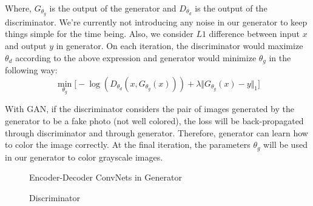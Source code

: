 \documentclass[oneside,a4paper,12pt]{report}
\begin{document}
	Where, $G_{\theta_{g}}$ is the output of the generator and $D_{\theta_d}$ is the output of the discriminator.	
	We're currently not introducing any noise in our generator to keep things simple for the time being. Also, we consider $L1$ difference between input $x$ and output $y$ in generator. On each iteration, the discriminator would maximize $\theta_d$ according to the above expression and generator would minimize $\theta_g$ in the following way:
	\[
		\min_{\theta_g}\Big[-\log(D_{\theta_d}(x,G_{\theta_g}(x)))+\lambda \Vert G_{\theta_g}(x) - y \Vert_1 \Big]
	\]
	
	With GAN, if the discriminator considers the pair of images generated by the generator to be a fake photo (not well colored), the loss will be back-propagated through discriminator and through generator. Therefore, generator can learn how to color the image correctly. At the final iteration, the parameters $\theta_g$ will be used in our generator to color grayscale images. 

  \begin{center}
	\begin{figure}[!htbp]
		\centering
	  \caption{Encoder-Decoder ConvNets in Generator}
	  \label{fig:gen_color-dig}
	\end{figure}
  \end{center}

  \begin{center}
	\begin{figure}[!htbp]
		\centering
	  \caption{Discriminator}
	  \label{fig:disc_color-dig}
	\end{figure}
  \end{center}
  
\end{document}
